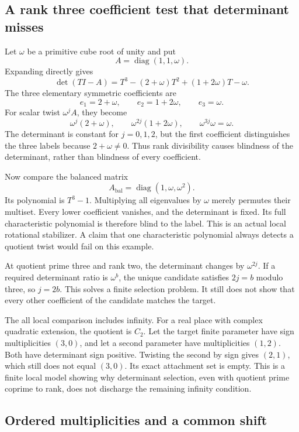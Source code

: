 \subsection{A rank three coefficient test that determinant misses}

Let \(\omega\) be a primitive cube root of unity and put
\[
 A=\operatorname{diag}(1,1,\omega).
\]
Expanding directly gives
\[
 \det(TI-A)
 =T^3-(2+\omega)T^2+(1+2\omega)T-\omega.
\]
The three elementary symmetric coefficients are
\[
 e_1=2+\omega,\qquad e_2=1+2\omega,\qquad e_3=\omega.
\]
For scalar twist \(\omega^jA\), they become
\[
 \omega^j(2+\omega),\qquad
 \omega^{2j}(1+2\omega),\qquad
 \omega^{3j}\omega=\omega.
\]
The determinant is constant for \(j=0,1,2\), but the first coefficient distinguishes the three labels because \(2+\omega\ne0\). Thus rank divisibility causes blindness of the determinant, rather than blindness of every coefficient.

Now compare the balanced matrix
\[
 A_{\mathrm{bal}}=\operatorname{diag}(1,\omega,\omega^2).
\]
Its polynomial is \(T^3-1\). Multiplying all eigenvalues by \(\omega\) merely permutes their multiset. Every lower coefficient vanishes, and the determinant is fixed. Its full characteristic polynomial is therefore blind to the label. This is an actual local rotational stabilizer. A claim that one characteristic polynomial always detects a quotient twist would fail on this example.

At quotient prime three and rank two, the determinant changes by \(\omega^{2j}\). If a required determinant ratio is \(\omega^b\), the unique candidate satisfies \(2j=b\) modulo three, so \(j=2b\). This solves a finite selection problem. It still does not show that every other coefficient of the candidate matches the target.

The all local comparison includes infinity. For a real place with complex quadratic extension, the quotient is \(C_2\). Let the target finite parameter have sign multiplicities \((3,0)\), and let a second parameter have multiplicities \((1,2)\). Both have determinant sign positive. Twisting the second by sign gives \((2,1)\), which still does not equal \((3,0)\). Its exact attachment set is empty. This is a finite local model showing why determinant selection, even with quotient prime coprime to rank, does not discharge the remaining infinity condition.

\subsection{Ordered multiplicities and a common shift}

